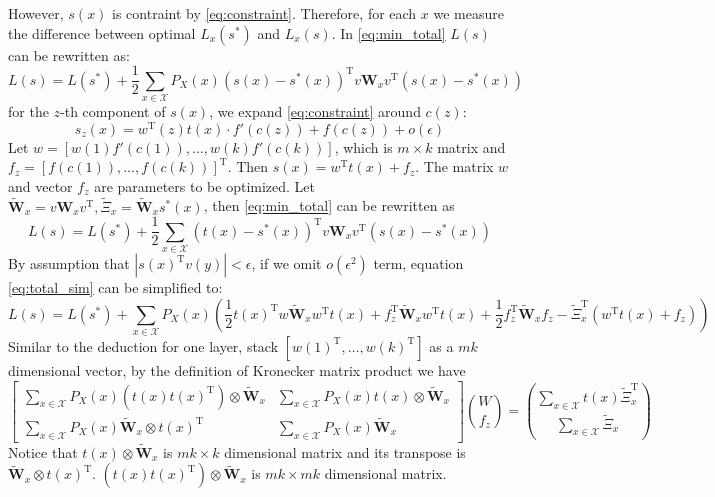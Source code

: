 \documentclass{article}
\def\T{\mathrm{T}}
\begin{document}
However, $s(x)$ is contraint by \eqref{eq:constraint}. Therefore, for each $x$ we measure the difference between optimal $L_x(s^*)$ and $L_x(s)$.
In \eqref{eq:min_total}  $L(s)$ can be rewritten as:
\begin{equation}
L(s)=L(s^*)+\frac{1}{2}\sum_{x\in\mathcal{X}}P_X(x)(s(x)-s^*(x))^\T v \bm{W}_x v^\T (s(x)-s^*(x))
\end{equation}
for the $z$-th component of $s(x)$, we expand \eqref{eq:constraint} around $c(z)$:
$$
s_z(x)=w^\T(z) t(x)\cdot f'(c(z))+f(c(z))+o(\epsilon)
$$
Let $w=[w(1)f'(c(1)),\dots,w(k)f'(c(k))]$, which is $m\times k$ matrix and $f_z=[f(c(1)),\dots,f(c(k))]^\T$. Then 
$s(x)=w^\T t(x)+f_z$. The matrix $w$ and vector $f_z$ are parameters to be optimized.
Let $\tilde{\bm{W}}_x=v\bm{W}_x v^\T,\tilde{\Xi}_x=\tilde{\bm{W}}_x s^*(x)$, then \eqref{eq:min_total} can be rewritten as
\begin{equation}\label{eq:total_sim}
L(s)=L(s^*) + \frac{1}{2}\sum_{x\in\mathcal{X}}(t(x)-s^*(x))^\T v \bm{W}_x v^\T (s(x)-s^*(x))
\end{equation}
By assumption that $|s(x)^\T v(y)|<\epsilon$, if we omit $o(\epsilon^2)$ term, equation \eqref{eq:total_sim} can be simplified to:
\begin{equation}
L(s)=L(s^*) + \sum_{x \in \mathcal{X}} P_X(x)\left(\frac{1}{2}t(x)^\T w \tilde{\bm{W}}_x w^\T t(x) + f_z^\T \tilde{\bm{W}}_x w^\T t(x) + \frac{1}{2} f_z^\T \tilde{\bm{W}}_x f_z - \tilde{\Xi}_x^\T (w^\T t(x)+f_z)\right)
\end{equation}
Similar to the deduction for one layer, stack $[w(1)^\T,\dots,w(k)^\T]$ as a $mk$ dimensional vector, by the definition of Kronecker matrix product we
have
\begin{equation}
\begin{bmatrix}
\sum_{x\in \mathcal{X}} P_X(x) (t(x)t(x)^\T)\otimes \tilde{\bm{W}}_x & \sum_{x\in \mathcal{X}} P_X(x) t(x)\otimes \tilde{\bm{W}}_x \\
\sum_{x\in \mathcal{X}} P_X(x) \tilde{\bm{W}}_x \otimes t(x)^\T & \sum_{x\in \mathcal{X}} P_X(x)\tilde{\bm{W}}_x
\end{bmatrix}\binom{W}{f_z}=\binom{\sum_{x\in \mathcal{X}}t(x)\tilde{\Xi}_x^\T}{\sum_{x\in \mathcal{X}}\tilde{\Xi}_x}
\end{equation}
Notice that $t(x)\otimes \tilde{\bm{W}}_x$ is $mk\times k$ dimensional matrix and its transpose is $\tilde{\bm{W}}_x \otimes t(x)^\T$.
$(t(x)t(x)^\T)\otimes \tilde{\bm{W}}_x$ is $mk \times mk$ dimensional matrix.
\end{document}
